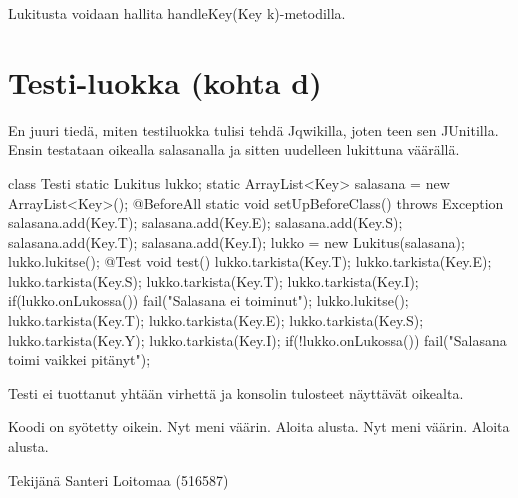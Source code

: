 Lukitusta voidaan hallita handleKey(Key k)-metodilla.

\pagebreak

\section{Testi-luokka (kohta d)}

\label{Testi-luokka}

En juuri tiedä, miten testiluokka tulisi tehdä Jqwikilla, joten teen sen JUnitilla. Ensin testataan oikealla salasanalla ja sitten uudelleen lukittuna väärällä.


\begin{javacode}
class Testi {
  static Lukitus lukko;
  static ArrayList<Key> salasana = new ArrayList<Key>();
  @BeforeAll
  static void setUpBeforeClass() throws Exception {
    salasana.add(Key.T);
    salasana.add(Key.E);
    salasana.add(Key.S);
    salasana.add(Key.T);
    salasana.add(Key.I);
    lukko = new Lukitus(salasana);
    lukko.lukitse();
  }
  @Test
  void test() {
    lukko.tarkista(Key.T);
    lukko.tarkista(Key.E);
    lukko.tarkista(Key.S);
    lukko.tarkista(Key.T);
    lukko.tarkista(Key.I);
    if(lukko.onLukossa()) {
      fail("Salasana ei toiminut");
    }
    lukko.lukitse();
    lukko.tarkista(Key.T);
    lukko.tarkista(Key.E);
    lukko.tarkista(Key.S);
    lukko.tarkista(Key.Y);
    lukko.tarkista(Key.I);
    if(!lukko.onLukossa()) {
      fail("Salasana toimi vaikkei pitänyt");
    }
  }
}
\end{javacode}

\pagebreak 

Testi ei tuottanut yhtään virhettä ja konsolin tulosteet näyttävät oikealta.

\begin{javacode}
Koodi on syötetty oikein.
Nyt meni väärin. Aloita alusta.
Nyt meni väärin. Aloita alusta.
\end{javacode}

Tekijänä Santeri Loitomaa (516587)

\label{endofpages}
